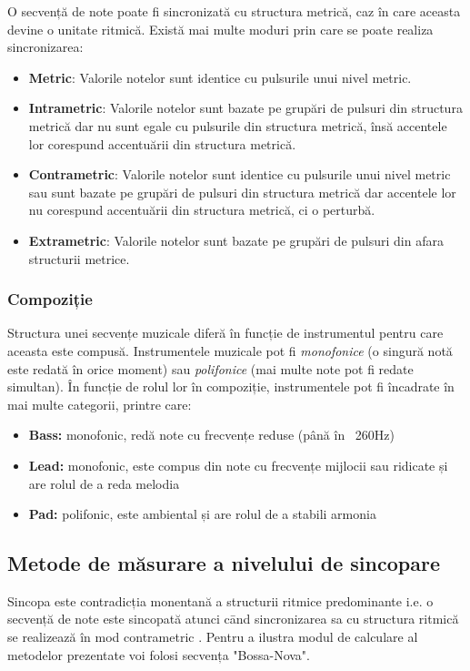 \noindent O secvență de note poate fi sincronizată cu structura metrică, caz în care aceasta devine o unitate ritmică. Există mai multe moduri prin care se poate realiza sincronizarea: \cite{rhythm}

\begin{itemize}[topsep=0pt,itemsep=0pt,parsep=0pt,partopsep=0pt]
    \item \textbf{Metric}: Valorile notelor sunt identice cu pulsurile unui nivel metric.
    \item \textbf{Intrametric}: Valorile notelor sunt bazate pe grupări de pulsuri din structura metrică dar nu sunt egale cu pulsurile din structura metrică, însă accentele lor corespund accentuării din structura metrică.
    \item \textbf{Contrametric}: Valorile notelor sunt identice cu pulsurile unui nivel metric sau sunt bazate pe grupări de pulsuri din structura metrică dar accentele lor nu corespund accentuării din structura metrică, ci o perturbă.
    \item \textbf{Extrametric}: Valorile notelor sunt bazate pe grupări de pulsuri din afara structurii metrice.
\end{itemize}

\subsubsection{Compoziție}
\noindent Structura unei secvențe muzicale diferă în funcție de instrumentul pentru care aceasta este compusă. Instrumentele muzicale pot fi \textit{monofonice} (o singură notă este redată în orice moment) sau \textit{polifonice} (mai multe note pot fi redate simultan). În funcție de rolul lor în compoziție, instrumentele pot fi încadrate în mai multe categorii, printre care: \par

\begin{itemize}
    \item \textbf{Bass:} monofonic, redă note cu frecvențe reduse (până în ~260Hz) 
    \item \textbf{Lead:} monofonic, este compus din note cu frecvențe mijlocii sau ridicate și are rolul de a reda melodia
    \item \textbf{Pad:} polifonic, este ambiental și are rolul de a stabili armonia
\end{itemize}

\subsection{Metode de măsurare a nivelului de sincopare}
\noindent Sincopa este contradicția monentană a structurii ritmice predominante i.e. o secvență de note este sincopată atunci cānd sincronizarea sa cu structura ritmică se realizează în mod contrametric \cite{rhythm}. Pentru a ilustra modul de calculare al metodelor prezentate voi folosi secvența "Bossa-Nova".

